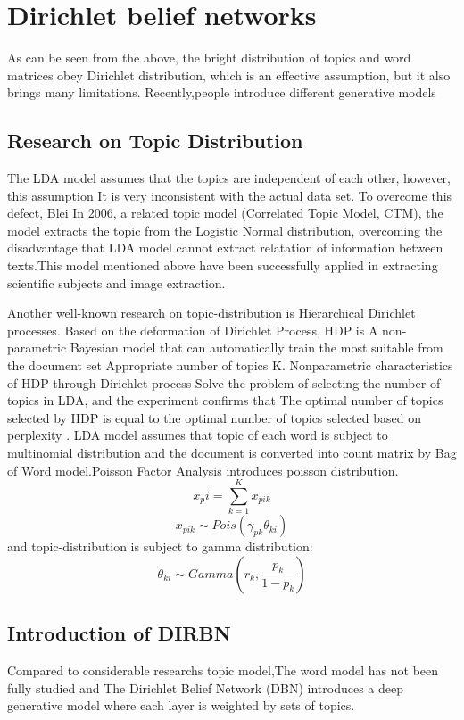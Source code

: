 \section{Dirichlet belief networks}
As can be seen from the above, the bright distribution of topics and word matrices obey Dirichlet distribution, which is an effective assumption, but it also brings many limitations. Recently,people introduce different generative models
\subsection{Research on Topic Distribution}

The LDA model assumes that the topics are independent of each other, however, this assumption
It is very inconsistent with the actual data set. To overcome this defect, Blei
In 2006, a related topic model (Correlated Topic Model,
CTM)\cite{A CORRELATED TOPIC MODEL OF SCIENCE 1}, the model extracts the topic from the Logistic Normal distribution, overcoming the disadvantage that
 LDA model cannot extract relatation of  information between texts.This model mentioned
above have been successfully applied in extracting scientific subjects and image extraction.

Another well-known research on topic-distribution is Hierarchical Dirichlet processes\cite{Teh}.
Based on the deformation of Dirichlet Process,
HDP is A non-parametric Bayesian model that can automatically train the most suitable from the document set
Appropriate number of topics K. Nonparametric characteristics of HDP through Dirichlet process
Solve the problem of selecting the number of topics in LDA, and the experiment confirms  that
The optimal number of topics selected by HDP is equal to the optimal number of topics selected based on perplexity
.
LDA model assumes that topic of each word is subject to multinomial distribution and the document is converted into count  matrix by Bag of Word model.Poisson Factor \cite{Beta-Negative Binomial Process and Poisson Factor Analysis} Analysis introduces poisson distribution.
\[
  x_pi = \sum_{k=1}^{K} x_{pik}
\]
\[
  x_{pik} \sim Pois(\gamma_{pk}\theta_{ki})
\]
and topic-distribution is subject to gamma distribution:
\[
  \theta_{ki} \sim Gamma(r_k,\frac{p_k}{1-p_k})
\]

\subsection{Introduction of DIRBN}
Compared to considerable researchs  topic model,The word model has not been fully studied and The Dirichlet Belief Network (DBN)\cite{Zhao} introduces a deep generative model where each layer is weighted by sets of  topics.

